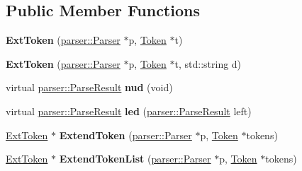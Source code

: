 \subsection*{Public Member Functions}
\begin{DoxyCompactItemize}
\item 
{\bfseries Ext\+Token} (\hyperlink{classfcal_1_1parser_1_1Parser}{parser\+::\+Parser} $\ast$p, \hyperlink{classfcal_1_1scanner_1_1Token}{Token} $\ast$t)\hypertarget{classfcal_1_1scanner_1_1ExtToken_afda92e9d2c7b66f2b9aaed8ac07bca46}{}\label{classfcal_1_1scanner_1_1ExtToken_afda92e9d2c7b66f2b9aaed8ac07bca46}

\item 
{\bfseries Ext\+Token} (\hyperlink{classfcal_1_1parser_1_1Parser}{parser\+::\+Parser} $\ast$p, \hyperlink{classfcal_1_1scanner_1_1Token}{Token} $\ast$t, std\+::string d)\hypertarget{classfcal_1_1scanner_1_1ExtToken_aa6846c2c9fb91a37715b0f41a0ffcda4}{}\label{classfcal_1_1scanner_1_1ExtToken_aa6846c2c9fb91a37715b0f41a0ffcda4}

\item 
virtual \hyperlink{classfcal_1_1parser_1_1ParseResult}{parser\+::\+Parse\+Result} {\bfseries nud} (void)\hypertarget{classfcal_1_1scanner_1_1ExtToken_a2e1ca27a07d55593ffd67780dbcad7dd}{}\label{classfcal_1_1scanner_1_1ExtToken_a2e1ca27a07d55593ffd67780dbcad7dd}

\item 
virtual \hyperlink{classfcal_1_1parser_1_1ParseResult}{parser\+::\+Parse\+Result} {\bfseries led} (\hyperlink{classfcal_1_1parser_1_1ParseResult}{parser\+::\+Parse\+Result} left)\hypertarget{classfcal_1_1scanner_1_1ExtToken_a42c352ef5e019a1155be80b4a40deb38}{}\label{classfcal_1_1scanner_1_1ExtToken_a42c352ef5e019a1155be80b4a40deb38}

\item 
\hyperlink{classfcal_1_1scanner_1_1ExtToken}{Ext\+Token} $\ast$ {\bfseries Extend\+Token} (\hyperlink{classfcal_1_1parser_1_1Parser}{parser\+::\+Parser} $\ast$p, \hyperlink{classfcal_1_1scanner_1_1Token}{Token} $\ast$tokens)\hypertarget{classfcal_1_1scanner_1_1ExtToken_ad6a5965961553c85d7fbaa688fabf052}{}\label{classfcal_1_1scanner_1_1ExtToken_ad6a5965961553c85d7fbaa688fabf052}

\item 
\hyperlink{classfcal_1_1scanner_1_1ExtToken}{Ext\+Token} $\ast$ {\bfseries Extend\+Token\+List} (\hyperlink{classfcal_1_1parser_1_1Parser}{parser\+::\+Parser} $\ast$p, \hyperlink{classfcal_1_1scanner_1_1Token}{Token} $\ast$tokens)\hypertarget{classfcal_1_1scanner_1_1ExtToken_a4995af1527ea8ba6ee99f3fa8646856d}{}\label{classfcal_1_1scanner_1_1ExtToken_a4995af1527ea8ba6ee99f3fa8646856d}


\end{DoxyCompactItemize}
